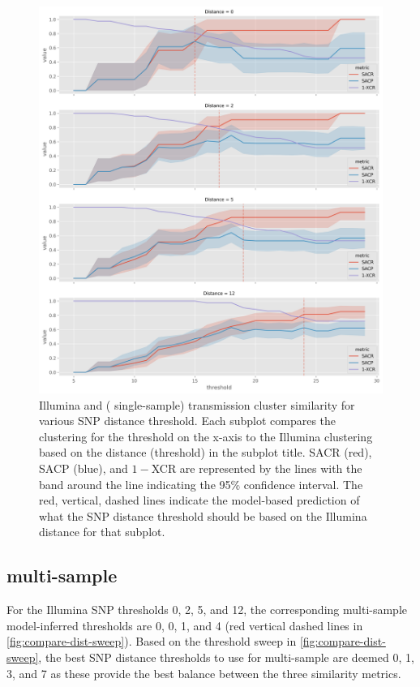\begin{figure}
\begin{center}
\includegraphics[width=0.90\columnwidth]{Appendix1/Figs/map-threshold-sweep.png}
\caption{{Illumina and \ont{} (\pandora{} single-sample) transmission cluster similarity for various SNP distance threshold. Each subplot compares the \ont{} clustering for the threshold on the x-axis to the Illumina clustering based on the distance (threshold) in the subplot title. SACR (red), SACP (blue), and $1-$XCR are represented by the lines with the band around the line indicating the 95\% confidence interval. The red, vertical, dashed lines indicate the model-based prediction of what the \ont{} SNP distance threshold should be based on the Illumina distance for that subplot.
{\label{fig:map-dist-sweep}}%
}}
\end{center}
\end{figure}

\subsection{\pandora{} multi-sample}

For the Illumina SNP thresholds 0, 2, 5, and 12, the corresponding \pandora{} multi-sample model-inferred thresholds are 0, 0, 1, and 4 (red vertical dashed lines in \autoref{fig:compare-dist-sweep}). Based on the threshold sweep in \autoref{fig:compare-dist-sweep}, the best SNP distance thresholds to use for \pandora{} multi-sample are deemed 0, 1, 3, and 7 as these provide the best balance between the three similarity metrics.

